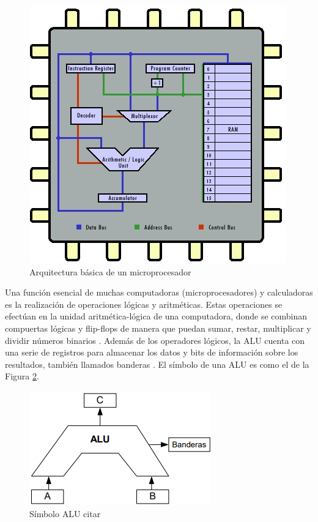 \documentclass[journal]{IEEEtran}
\begin{document}
	\begin{figure}[hbtp]
		\centering
		\includegraphics[scale = 0.5]{img/microprocesador.jpg}
		\caption{Arquitectura básica de un microprocesador \cite{Gonzalez2017}}
		\label{fig:microprocesador}
	\end{figure}

	Una función esencial de muchas computadoras (microprocesadores) y calculadoras es la realización de operaciones lógicas y aritméticas. Estas operaciones se efectúan en la unidad aritmética-lógica de una computadora, donde se combinan compuertas lógicas y flip-flops de manera que puedan sumar, restar, multiplicar y dividir números binarios \cite{Tocci2007}. Además de los operadores lógicos, la ALU cuenta con una serie de registros para almacenar los datos y bits de información sobre los resultados, también llamados banderas \cite{Garcia}. El símbolo de una ALU es como el de la Figura \ref{fig:simboloalu}.
	
	\begin{figure}[!htb]
		\centering
		\includegraphics[scale = 0.5]{img/simboloalu.png}
		\caption{Símbolo ALU citar}
		\label{fig:simboloalu}
	\end{figure}
	
\end{document}
